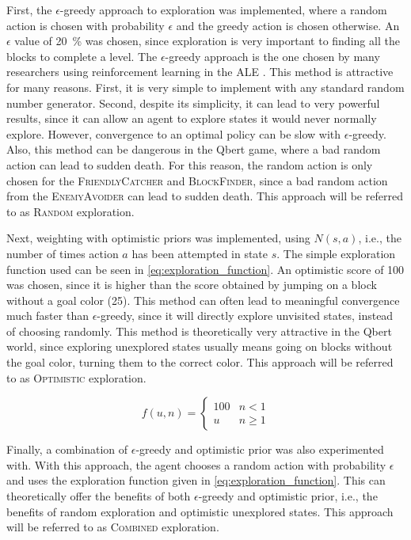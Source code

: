 \documentclass[a4paper,titlepage]{article}
\begin{document}
	First, the $\epsilon$-greedy approach to exploration was implemented, where a random action is chosen with probability $\epsilon$ and the greedy action is chosen otherwise. An $\epsilon$ value of \SI{20}{\percent} was chosen, since exploration is very important to finding all the blocks to complete a level. The $\epsilon$-greedy approach is the one chosen by many researchers using reinforcement learning in the ALE \cite{defazio,bellemare,mnih}. This method is attractive for many reasons. First, it is very simple to implement with any standard random number generator. Second, despite its simplicity, it can lead to very powerful results, since it can allow an agent to explore states it would never normally explore. However, convergence to an optimal policy can be slow with $\epsilon$-greedy. Also, this method can be dangerous in the Qbert game, where a bad random action can lead to sudden death. For this reason, the random action is only chosen for the \textsc{FriendlyCatcher} and \textsc{BlockFinder}, since a bad random action from the \textsc{EnemyAvoider} can lead to sudden death. This approach will be referred to as \textsc{Random} exploration.
	
	Next, weighting with optimistic priors was implemented, using $N(s, a)$, i.e., the number of times action $a$ has been attempted in state $s$. The simple exploration function used can be seen in \cref{eq:exploration_function}. An optimistic score of 100 was chosen, since it is higher than the score obtained by jumping on a block without a goal color (25). This method can often lead to meaningful convergence much faster than $\epsilon$-greedy, since it will directly explore unvisited states, instead of choosing randomly. This method is theoretically very attractive in the Qbert world, since exploring unexplored states usually means going on blocks without the goal color, turning them to the correct color. This approach will be referred to as \textsc{Optimistic} exploration.
	
	\begin{equation} \label{eq:exploration_function}
		f(u, n) =
		\begin{cases}
			100 & n < 1 \\
			u & n \geq 1
		\end{cases}
	\end{equation}
	
	Finally, a combination of $\epsilon$-greedy and optimistic prior was also experimented with. With this approach, the agent chooses a random action with probability $\epsilon$ and uses the exploration function given in \cref{eq:exploration_function}. This can theoretically offer the benefits of both $\epsilon$-greedy and optimistic prior, i.e., the benefits of random exploration and optimistic unexplored states. This approach will be referred to as \textsc{Combined} exploration.
	
\end{document}

